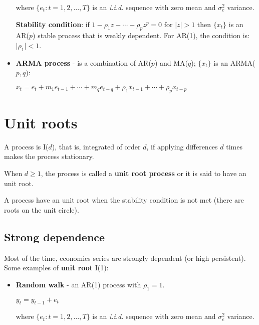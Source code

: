 \documentclass[10pt, a4paper, landscape]{article}
\begin{document}
\begin{multicols}{3}
\begin{itemize}[leftmargin=*]
			where $\lbrace e_{t} : t = 1, 2, \ldots, T \rbrace$ is an \textsl{i.i.d.} sequence with zero mean and $\sigma^{2}_{e}$ variance.
			
			\textbf{Stability condition}: if $1 - \rho_{1} z - \cdots - \rho_{p} z^{p} = 0$ for $\lvert z \rvert > 1$ then $\lbrace x_{t} \rbrace$ is an AR($p$) stable process that is weakly dependent. For AR(1), the condition is: $\lvert \rho_{1} \rvert < 1$.
		
			\item \textbf{ARMA process} - is a combination of AR($p$) and MA($q$); $\lbrace x_{t} \rbrace$ is an ARMA($p, q$):
			
			\begin{center}
				$x_{t} = e_{t} + m_{1} e_{t - 1} + \cdots + m_{q} e_{t - q} + \rho_{1} x_{t - 1} + \cdots + \rho_{p} x_{t - p}$
			\end{center}
		\end{itemize}
		
		\columnbreak
		
		\section*{Unit roots}
		
		A process is I($d$), that is, integrated of order $d$, if applying differences $d$ times makes the process stationary.
		
		When $d \geq 1$, the process is called a \textbf{unit root process} or it is said to have an unit root.
		
		A process have an unit root when the stability condition is not met (there are roots on the unit circle).
		
		\subsection*{Strong dependence}
		
		Most of the time, economics series are strongly dependent (or high persistent). Some examples of \textbf{unit root} I(1):
		
		\begin{itemize}[leftmargin=*]
			\item \textbf{Random walk} - an AR(1) process with $\rho_{1} = 1$.
			
			\begin{center}
				$y_{t} = y_{t - 1} + e_{t}$
			\end{center}
			
			where $\lbrace e_{t} : t = 1, 2, \ldots, T \rbrace$ is an \textsl{i.i.d.} sequence with zero mean and $\sigma^{2}_{e}$ variance.
			

\end{itemize}
\end{multicols}
\end{document}
